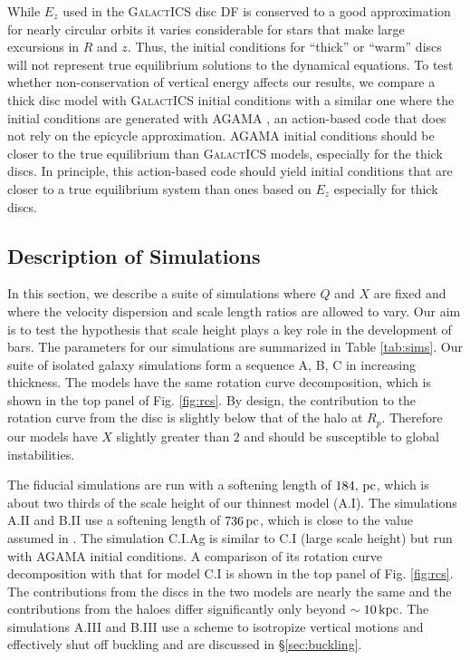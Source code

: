 While $E_z$ used in the \textsc{GalactICS} disc DF
is conserved to a good approximation for nearly circular orbits it
varies considerable for stars that make large excursions in $R$ and
$z$.  Thus, the initial conditions for ``thick'' or ``warm'' discs
will not represent true equilibrium solutions to the dynamical
equations.  To test whether non-conservation of vertical energy
affects our results, we compare a thick disc model with
\textsc{GalactICS} initial conditions with a similar one where the
initial conditions are generated with \textsc{AGAMA} \citep{agama}, 
{an action-based code that does not rely on the epicycle 
approximation.  \textsc{AGAMA} initial conditions should be closer 
to the true equilibrium than \textsc{GalactICS} models, especially for the thick discs.}
In principle, this action-based code should yield initial conditions
that are closer to a true equilibrium system than ones based on $E_z$
especially for thick discs.

\subsection{Description of Simulations}

In this section, we describe a suite of simulations where $Q$ and $X$
are fixed and where the velocity dispersion and scale length
ratios are allowed to vary.  Our aim is to test the hypothesis that scale
height plays a key role in the development of bars.  The parameters
for our simulations are summarized in Table \ref{tab:sims}.  Our suite
of isolated galaxy simulations form a sequence A, B, C in increasing
thickness.  The models have the same rotation curve decomposition,
which is shown in the top panel of Fig. \ref{fig:rcs}.  By design, the
contribution to the rotation curve from the disc is slightly below
that of the halo at $R_p$.  Therefore our models have $X$ slightly
greater than $2$ and should be susceptible to global instabilities.

The fiducial simulations are run with a softening length of
$184,\,{\rm pc}$, which is about two thirds of the scale height of our
thinnest model (A.I).  The simulations A.II and B.II use a softening
length of $736\,{\rm pc}$, which is close to the value assumed in
\citet{YurinSpringelStellarDisks}.  The simulation C.I.Ag is similar
to C.I (large scale height) but run with \textsc{AGAMA} initial
conditions.  A comparison of its rotation curve decomposition with
that for model C.I is shown in the top panel of Fig. \ref{fig:rcs}.
The contributions from the discs in the two models are nearly the same
and the contributions from the haloes differ significantly only beyond
$\sim 10\,{\rm kpc}$.  The simulations A.III and B.III use a scheme to
isotropize vertical motions and effectively shut off buckling and are
discussed in \S \ref{sec:buckling}.

